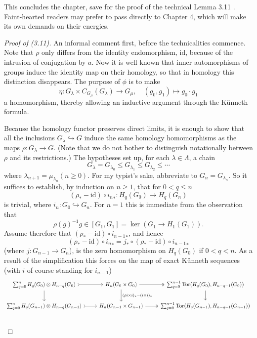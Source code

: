 \documentclass[openany,leqno]{book}  %
\newcommand{\id}{\mathrm{id}} %
\newcommand{\tor}{\mathrm{Tor}}
\begin{document}
This concludes the chapter, save for the proof of the technical Lemma 3.11 . Faint-hearted readers may prefer to pass directly to Chapter 4, which will make its own demands on their energies.
\begin{proof}[Proof of (3.11)]
An informal comment first, before the technicalities commence. Note that $\rho$ only differs from the identity endomorphism, $\id$, because of the intrusion of conjugation by $a$. Now it is well known that inner automorphisms of groups induce the identity map on their homology, so that in homology this distinction disappears. The purpose of $\phi$ is to make
\[\eta\colon   G_\lambda \times C_{G_\mu}(G_\lambda) \longrightarrow  G_\mu, \quad (g_0,g_1)\mapsto g_0\cdot g_1\]
a homomorphism, thereby allowing an inductive argument through the K\"{u}nneth formula.

Because the homology functor preserves direct limits, it is enough to show that all the 
inclusions $G_\lambda \hookrightarrow G$ induce the same homology homomorphisms as the maps $\rho\colon   G_\lambda \longrightarrow G$. (Note that we do not bother to distinguish notationally between $\rho$ and its restrictions.) The hypotheses set up, for each $\lambda \in \Lambda$, a chain
\[G_\lambda =G_{\lambda _0}\leqslant G_{\lambda _1}\leqslant G_{\lambda _2}\leqslant \cdots \]
where  $\lambda_{n+1}=\mu_{\lambda_n} (n\geqslant 0)$. For my typist's sake, abbreviate to $G_n= G_{\lambda_n}$. So it suffices to establish, by induction on $n \geqslant 1$, that for $0<q \leqslant n$
 \[(\rho_*-\id)\circ {i_n}_*\colon  H_q(G_0)\longrightarrow H_q(G_n)\]
is trivial, where $i_n \colon   G_0 \hookrightarrow G_n$. For $n = 1$ this is immediate from the observation that 
\[\rho(g)^{-1}g\in [G_1, G_1 ] = \ker (G_1 \longrightarrow H_1(G_1)).\]
Assume therefore that $(\rho_*-\id)\circ {i_{n-1}}_*$, and hence
\[(\rho_*-\id)\circ {i_n}_*=j_* \circ (\rho_*-\id)\circ {i_{n-1}}_*\]
(where $j \colon   G_{n-1}\longrightarrow G_n$), is the zero homomorphism on $H_q(G_0)$ if $0<q<n$. As a result of the simplification this forces on the map of exact K\"{u}nneth sequences (with $i$ of course standing for $i_{n-1}$)
\[\begin{tikzcd}
\sum_{q=0}^n H_q(G_0)\otimes H_{n-q}(G_0) \arrow[tail]{r} \arrow{d} &
 H_n(G_0\times G_0) \arrow[two heads]{r} \arrow{d}{(\rho i\times i)_*-(i\times i)_*} &
  \sum_{q=0}^{n-1}\tor (H_q(G_0),H_{n-q-1}(G_0)) \arrow{d}\\
\sum_{q=0}^n H_q(G_{n-1})\otimes H_{n-q}(G_{n-1}) \arrow[tail]{r} &
H_n(G_{n-1}\times G_{n-1}) \arrow[two heads]{r} &
\sum_{q=0}^{n-1}\tor (H_q(G_{n-1}),H_{n-q-1}(G_{n-1})) \\
\end{tikzcd}\]


\end{proof}
\end{document}
